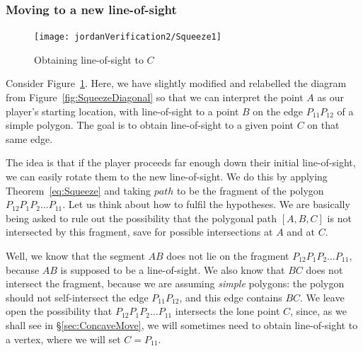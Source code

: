 \subsubsection{Moving to a new line-of-sight}\label{sec:MoveToNew}
\begin{figure}
\centering\texttt{[image: jordanVerification2/Squeeze1]}
\caption{Obtaining line-of-sight to $C$}
\label{fig:Squeeze1}
\end{figure}

Consider Figure~\ref{fig:Squeeze1}. Here, we have slightly modified and relabelled the diagram from Figure~\ref{fig:SqueezeDiagonal} so that we can interpret the point $A$ as our player's starting location, with line-of-sight to a point $B$ on the edge $P_{11}P_{12}$ of a simple polygon. The goal is to obtain line-of-sight to a given point $C$ on that same edge.

The idea is that if the player proceeds far enough down their initial line-of-sight, we can easily rotate them to the new line-of-sight. We do this by applying Theorem~\ref{eq:Squeeze} and taking $path$ to be the fragment of the polygon $P_{12}P_1P_2\ldots P_{11}$. Let us think about how to fulfil the hypotheses. We are basically being asked to rule out the possibility that the polygonal path $[A,B,C]$ is not intersected by this fragment, save for possible intersections at $A$ and at $C$. 

Well, we know that the segment $AB$ does not lie on the fragment $P_{12}P_1P_2\ldots P_{11}$, because $AB$ is supposed to be a line-of-sight. We also know that $BC$ does not intersect the fragment, because we are assuming \emph{simple} polygons: the polygon should not self-intersect the edge $P_{11}P_{12}$, and this edge contains $BC$. We leave open the possibility that $P_{12}P_1P_2\ldots P_{11}$ intersects the lone point $C$, since, as we shall see in \S\ref{sec:ConcaveMove}, we will sometimes need to obtain line-of-sight to a vertex, where we will set $C=P_{11}$.

